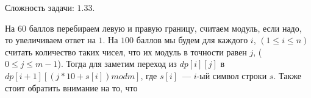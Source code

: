 \documentclass[12pt]{article}
\begin{document}

Сложность задачи: $1.33$.

На $60$ баллов перебираем левую и правую границу, считаем модуль, если надо, то увеличиваем ответ на $1$.
На $100$ баллов мы будем для каждого $i$, $(1 \le i \le n)$ считать количество таких чисел, что их модуль в точности равен $j$, ($0 \le j \le m - 1$).
Тогда для заметим переход из $dp[i][j]$ в $dp[i + 1][(j * 10 + s[i]) mod m]$, где $s[i]$~--- $i$-ый символ строки $s$.
Также стоит обратить внимание на то, что

\EndEditorial
\end{document}
